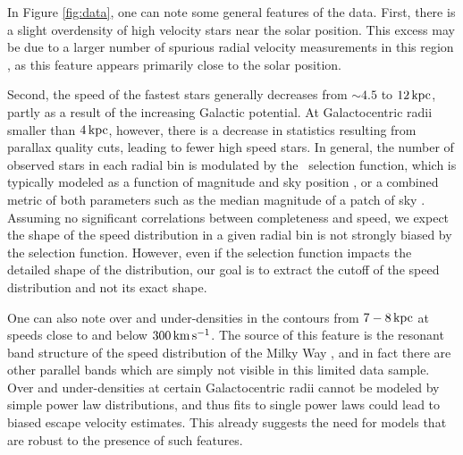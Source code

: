 In Figure \ref{fig:data}, one can note some general features of the data. First, there is a slight overdensity of high velocity stars near the solar position. This excess may be due to a larger number of spurious radial velocity measurements in this region \citep{gaiaRVs}, as this feature appears primarily close to the solar position. 
%

Second, the speed of the fastest stars generally decreases from $\sim 4.5$ to $12\,\rm{kpc}$, partly as a result of the increasing Galactic potential. At Galactocentric radii smaller than $4\,\rm{kpc}$, however, there is a decrease in statistics resulting from parallax quality cuts, leading to fewer high speed stars. In general, the number of observed stars in each radial bin is modulated by the \Gaia~selection function, which is typically modeled as a function of magnitude and sky position \citep{gaiaeDR3selection}, or a combined metric of both parameters such as the median magnitude of a patch of sky \citep{gaiaDR3selection}. 
Assuming no significant correlations between completeness and speed, we  expect the shape of the speed distribution in a given radial bin is not strongly biased by the selection function. However, even if the selection function impacts the detailed shape of the distribution, our goal is to extract the cutoff of the speed distribution and not its exact shape.

One can also note over and under-densities in the contours from $7-8\,\rm{kpc}$ at speeds close to and below $300\,\rm{km\,s^{-1}}$. The source of this feature is the resonant band structure of the speed distribution of the Milky Way \citep{Antoja2018}, and in fact there are other parallel bands which are simply not visible in this limited data sample. Over and under-densities at certain Galactocentric radii cannot be modeled by simple power law distributions, and thus fits to single power laws could lead to biased escape velocity estimates.
This already suggests the need for models that are robust to the presence of such features.
